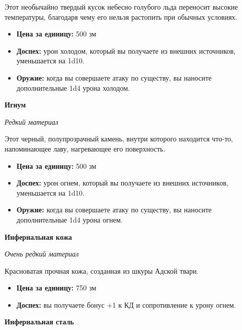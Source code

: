 \documentclass[a4paper, 9pt, twocolumn]{book}
\begin{document}
	\smallskip
	
	\noindent Этот необычайно твердый кусок небесно голубого льда переносит высокие температуры, благодаря чему его нельзя растопить при обычных условиях.
	
	\begin{itemize}
		\item \textbf{Цена за единицу:} 500 зм
		
		\item \textbf{Доспех:} урон холодом, который вы получаете из внешних источников, уменьшается на 1d10.
		
		\item \textbf{Оружие:} когда вы совершаете атаку по существу, вы наносите дополнительные 1d4 урона холодом.
	\end{itemize}

	\noindent \textbf{Игнум}
	
	\noindent \textit{Редкий материал}
	
	\smallskip
	
	\noindent Этот черный, полупрозрачный камень, внутри которого находится что-то, напоминающее лаву, нагревающее его поверхность.
	
	\begin{itemize}
		\item \textbf{Цена за единицу:} 500 зм
		
		\item \textbf{Доспех:} урон огнем, который вы получаете из внешних источников, уменьшается на 1d10.
		
		\item \textbf{Оружие:} когда вы совершаете атаку по существу, вы наносите дополнительные 1d4 урона огнем.
	\end{itemize}

	\noindent \textbf{Инфернальная кожа}
	
	\noindent \textit{Очень редкий материал}
	
	\smallskip
	
	\noindent Красноватая прочная кожа, созданная из шкуры Адской твари.
	
	\begin{itemize}
		\item \textbf{Цена за единицу:} 750 зм
		
		\item \textbf{Доспех:} вы получаете бонус +1 к КД и сопротивление к урону огнем.
	\end{itemize}

	\noindent \textbf{Инфернальная сталь}
	
\end{document}
